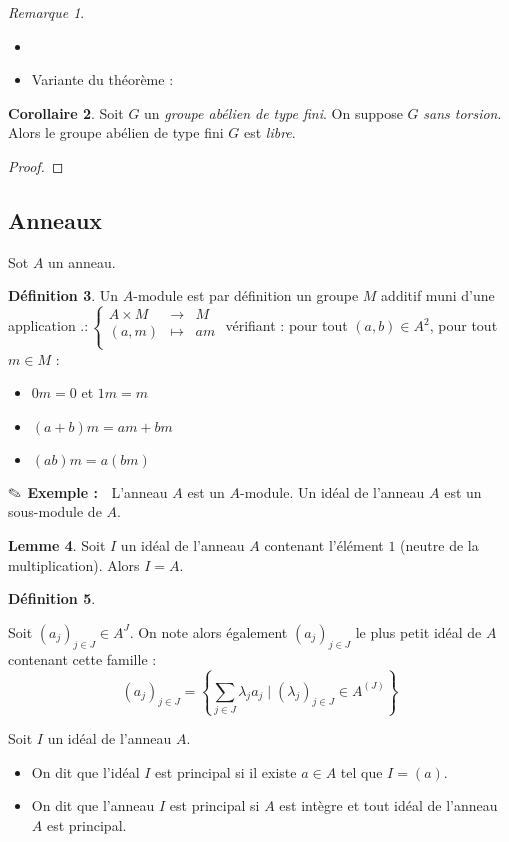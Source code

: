 \documentclass{report}
\newcommand{\dis}{\displaystyle}
\theoremstyle{definition}
\newtheorem{defi}{Définition}[chapter]
\newtheorem{lem}[defi]{Lemme}
\newtheorem{coro}[defi]{Corollaire}
\theoremstyle{remark}
\newtheorem{rem}[defi]{Remarque}
\newcommand{\exem}{{\textbf{$\text{\ding{46}}$ Exemple : \ }}}
\newcommand{\app}[5]{#1:\left\{\begin{array}{ccl}
#2 & \longrightarrow & #3 \\
#4 & \longmapsto & #5  \\
\end{array}\right.
}
\begin{document}
\begin{rem}
\begin{itemize}
\item  
\item Variante du théorème :
\end{itemize}
\end{rem}

\begin{coro}
Soit $G$ un \textit{groupe abélien de type fini}. On suppose $G$ \textit{sans torsion}. Alors le groupe abélien de type fini $G$ est \textit{libre}.
\end{coro}

\begin{proof}

\end{proof}

\subsection{Anneaux}

Sot $A$ un anneau.

\begin{defi}
Un $A$-module est par définition un groupe $M$ additif muni d'une application $\app{.}{A \times M}{M}{(a,m)}{am}$ vérifiant : pour tout $(a,b) \in A^2$, pour tout $m \in M$ :
\begin{itemize}
\item $0m=0$ et $1m=m$
\item $(a+b)m=am+bm$
\item $(ab)m=a(bm)$
\end{itemize}
\end{defi}

\exem L'anneau $A$ est un $A$-module. Un idéal de l'anneau $A$ est un sous-module de $A$. 

\begin{lem}
Soit $I$ un idéal de l'anneau $A$ contenant l'élément $1$ (neutre de la multiplication). Alors $I=A$.
\end{lem}

\begin{defi}
\begin{point}
\item Soit $(a_j)_{j\in J} \in A^J$. On note alors également $ (a_j)_{j\in J}$ le plus petit idéal de $A$ contenant cette famille : \[(a_j)_{j\in J}=\left\{\dis \sum_{j \in J} \lambda_ja_j \mid (\lambda_j)_{j\in J} \in A^{(J)}  \right\} \]
\item Soit $I$ un idéal de l'anneau $A$. 
\begin{itemize}
\item On dit que l'idéal $I$ est principal si il existe $a \in A$ tel que $I=(a)$.
\item On dit que l'anneau $I$ est principal si $A$ est intègre et tout idéal de l'anneau $A$ est principal.
\end{itemize} 
\end{point}
\end{defi}
\end{document}
